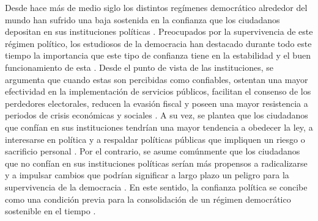 \documentclass[12pt,twoside]{templates/facsothesis}
\begin{document}
Desde hace más de medio siglo los distintos regímenes democrático alrededor del mundo han sufrido una baja sostenida en la confianza que los ciudadanos depositan en sus instituciones políticas \citep{valgardssonCrisisPoliticalTrust2025}. Preocupados por la supervivencia de este régimen político, los estudiosos de la democracia han destacado durante todo este tiempo la importancia que este tipo de confianza tiene en la estabilidad y el buen funcionamiento de esta \citep{zmerliPoliticalTrust2022}. Desde el punto de vista de las instituciones, se argumenta que cuando estas son percibidas como confiables, ostentan una mayor efectividad en la implementación de servicios públicos, facilitan el consenso de los perdedores electorales, reducen la evasión fiscal y poseen una mayor resistencia a periodos de crisis económicas y sociales \citep{vandermeerDeeplyRootedConcern2017, newtonSocialPoliticalTrust2017, citrinPoliticalTrustCynical2018}. A su vez, se plantea que los ciudadanos que confían en sus instituciones tendrían una mayor tendencia a obedecer la ley, a interesarse en política y a respaldar políticas públicas que impliquen un riesgo o sacrificio personal \citep{citrinPoliticalTrustCynical2018, zmerliPoliticalTrust2022}. Por el contrario, se asume comúnmente que los ciudadanos que no confían en sus instituciones políticas serían más propensos a radicalizarse y a impulsar cambios que podrían significar a largo plazo un peligro para la supervivencia de la democracia \citep{andersonSensitiveLeftImpervious2008}. En este sentido, la confianza política se concibe como una condición previa para la consolidación de un régimen democrático sostenible en el tiempo \citep{vandermeerDeeplyRootedConcern2017}.
\end{document}
